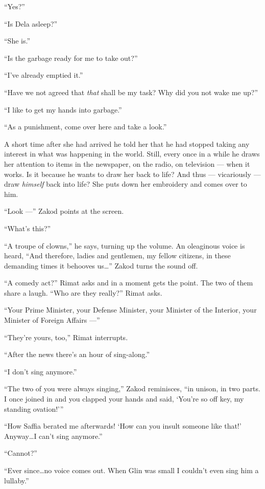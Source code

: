 \documentclass[twoside,11pt,openany]{book}
\begin{document}
``Yes?''

``Is Dela asleep?''

``She is.''

``Is the garbage ready for me to take out?''

``I've already emptied it.''

``Have we not agreed that \textit{that} shall be my task? Why did you not wake me up?''

``I like to get my hands into garbage.''

``As a punishment, come over here and take a look.''

A short time after she had arrived he told her that he had stopped taking any interest in what was happening in the
world. Still, every once in a while he draws her attention to items in the newspaper, on the radio, on television ---
when it works. Is it because he wants to draw her back to life? And thus --- vicariously --- draw \textit{himself} back
into life? She puts down her embroidery and comes over to him.

``Look ---'' Zakod points at the screen.

``What's this?''

``A troupe of clowns,'' he says, turning up the volume. An oleaginous voice is heard,
``And therefore, ladies and gentlemen, my fellow citizens, in these demanding times it behooves
us{\ldots}'' Zakod turns the sound off.

``A comedy act?'' Rimat asks and in a moment gets the point. The two of them share a laugh.
``Who are they really?'' Rimat asks.

``Your Prime Minister, your Defense Minister, your Minister of the Interior, your Minister of Foreign
Affairs ---''

``They're yours, too,'' Rimat interrupts.

``After the news there's an hour of sing-along.''

``I don't sing anymore.''

``The two of you were always singing,'' Zakod reminisces, ``in unison, in two
parts. I once joined in and you clapped your hands and said, `You're so off key, my standing ovation!'\thinspace''

``How Saffia berated me afterwards!  `How can you insult someone like that!' Anyway{\ldots}I can't sing
anymore.''

``Cannot?''

``Ever since{\ldots}no voice comes out. When Glin was small I couldn't even sing him a
lullaby.''
\end{document}

